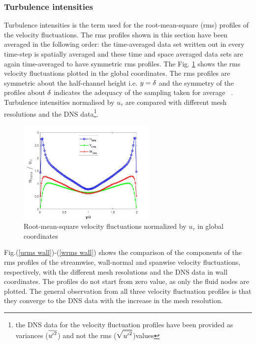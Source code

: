 \subsubsection{Turbulence intensities} \label{Turbulence intensities UDNS}
Turbulence intensities is the term used for the root-mean-square (rms) profiles of the velocity fluctuations. The rms profiles shown in this section have been averaged in the following order: 
the time-averaged data set written out in every time-step is spatially averaged and these time and space averaged data sets are again time-averaged to have symmetric rms profiles. The Fig. \ref{Turbulence intensities} shows the rms velocity fluctuations plotted in the global coordinates. The rms profiles are symmetric about the half-channel height i.e. $y = \delta$ and the symmetry of the profiles about $\delta$ indicates the adequacy of the sampling taken for average ~\cite{kim:moin:moser:87}. Turbulence intensities normalised by $u_\tau$ are compared with different mesh resolutions and the DNS data\footnote{the DNS data for the velocity fluctuation profiles have been provided as variances ($\overline{{{u}^\prime}^2}$) and not the rms ($\sqrt{\overline{{{u}^\prime}^2}}$)values}. 
%
\begin{figure}[h!]
    \centering
    \includegraphics[width=0.6\textwidth]{06_Resultsanddiscussion/figur/UDNS_2016/Turbulence ontensities_Mesh2.jpg}
    \caption{Root-mean-square velocity fluctuations normalized by $u_\tau$ in global coordinates}
    \label{Turbulence intensities}
\end{figure}
%

Fig.(\ref{urms wall})-(\ref{wrms wall}) shows the comparison of the components of the rms profiles of the streamwise, wall-normal and spanwise velocity fluctuations, respectively, with the different mesh resolutions and the DNS data in wall coordinates. The profiles do not start from zero value, as only the fluid nodes are plotted. The general observation from all three velocity fluctuation profiles is that they converge to the DNS data with the increase in the mesh resolution. 

